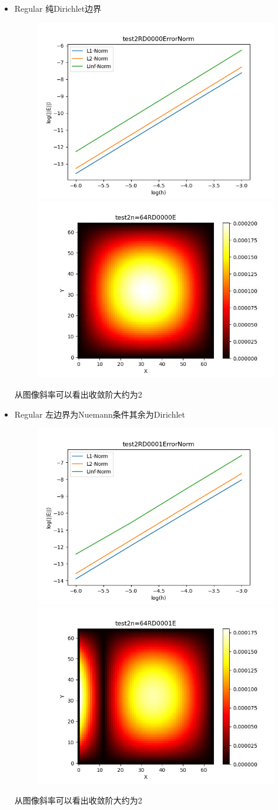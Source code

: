 \documentclass{article}
\begin{document}
\begin{itemize}
    \item Regular 纯Dirichlet边界
    \begin{figure}[h]
        \centering
        \includegraphics[width=0.35\linewidth]{test2RD0000ErrorNormjpg.png}
        \includegraphics[width=0.35\linewidth]{test2n=64RD0000E.jpg}
    \end{figure}
    
    从图像斜率可以看出收敛阶大约为2
    \newpage
    \item Regular 左边界为Nuemann条件其余为Dirichlet
    \begin{figure}[h]
        \centering
        \includegraphics[width=0.35\linewidth]{test2RD0001ErrorNormjpg.png}
        \includegraphics[width=0.35\linewidth]{test2n=64RD0001E.jpg}
    \end{figure}

    从图像斜率可以看出收敛阶大约为2
    

\end{itemize}
\end{document}

